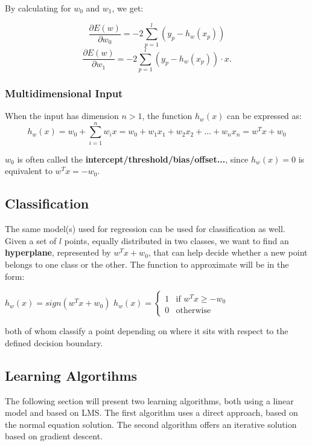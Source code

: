 By calculating for $w_0$ and $w_1$, we get:

\begin{equation*}
\dfrac{\partial E(w)}{\partial w_0} = -2 \sum_{p=1}^l (y_p - h_w(x_p))
\end{equation*}
\begin{equation*}
\dfrac{\partial E(w)}{\partial w_1} = -2 \sum_{p=1}^l (y_p - h_w(x_p)) \cdot x.
\end{equation*}

\subsubsection{Multidimensional Input}
When the input has dimension $n>1$, the function $h_w(x)$ can be expressed as:
\begin{equation*}
    h_w(x) = w_0 + \sum_{i=1}^n w_i x = w_0 + w_1x_1 + w_2x_2 + ... + w_nx_n = \boxed{w^T x + w_0}
\end{equation*}

$w_0$ is often called the \textbf{intercept/threshold/bias/offset...}, since $h_w(x) = 0$ is equivalent to $w^T x = -w_0$.

\subsection{Classification}
The same model(s) used for regression can be used for classification as well. Given a set of $l$ points, equally distributed in two classes, we want to find an \textbf{hyperplane}, represented by $w^Tx + w_0$, that can help decide whether a new point belongs to one class or the other. The function to approximate will be in the form:

\begin{center}
    $h_w(x) = sign(w^Tx + w_0)$\hfill
    $h_w(x) = \begin{cases}
                1 & \text{if } w^Tx \geq -w_0 \\
                0& \text{otherwise}
            \end{cases}$
\end{center}
both of whom classify a point depending on where it sits with respect to the defined decision boundary. 

\subsection{Learning Algortihms}

The following section will present two learning algorithms, both using a linear model and based on LMS.
The first algorithm uses a direct approach, based on the normal equation solution. The second algorithm offers an iterative solution based on gradient descent.

